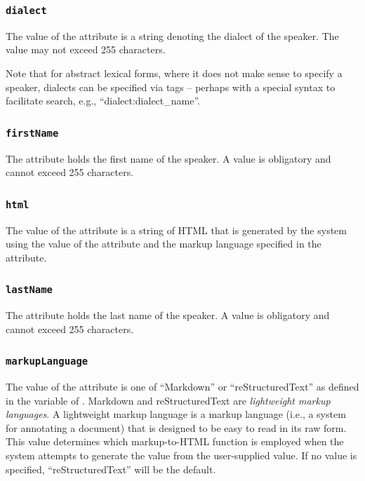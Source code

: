 \documentclass[letterpaper,10pt,english]{sphinxmanual}
\begin{document}
\subsubsection{\texttt{dialect}}
\label{datastructure:dialect}
The value of the  attribute is a string denoting the dialect of the
speaker.  The value may not exceed 255 characters.

Note that for abstract lexical forms, where it does not make sense to specify a
speaker, dialects can be specified via tags -- perhaps with a special syntax to
facilitate search, e.g., ``dialect:dialect\_name''.


\subsubsection{\texttt{firstName}}
\label{datastructure:firstname}
The  attribute holds the first name of the speaker.  A value is
obligatory and cannot exceed 255 characters.


\subsubsection{\texttt{html}}
\label{datastructure:id49}
The value of the  attribute is a string of HTML that is generated by the
system using the value of the  attribute and the markup language
specified in the  attribute.


\subsubsection{\texttt{lastName}}
\label{datastructure:lastname}
The  attribute holds the last name of the speaker.  A value is
obligatory and cannot exceed 255 characters.


\subsubsection{\texttt{markupLanguage}}
\label{datastructure:id50}
The value of the  attribute is one of ``Markdown'' or
``reStructuredText'' as defined in the  variable of
.  Markdown and reStructuredText are \emph{lightweight markup
languages}.  A lightweight markup language is a markup language (i.e., a system
for annotating a document) that is designed to be easy to read in its raw form.
This value determines which markup-to-HTML function is employed when the system
attempts to generate the  value from the user-supplied 
value.  If no value is specified, ``reStructuredText'' will be the default.
\end{document}
